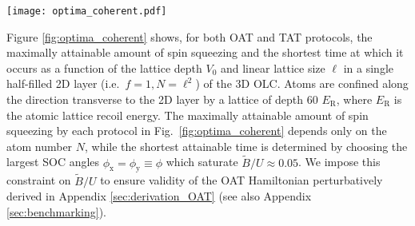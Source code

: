 \documentclass[aps,prx,superscriptaddress,notitlepage,twocolumn,longbibliography]{revtex4-2}
\renewcommand{\t}{\text} %
\newcommand{\x}{\text{x}}
\newcommand{\y}{\text{y}}
\begin{document}
\begin{figure*}
\centering
\texttt{[image: optima\_coherent.pdf]}
\caption{{\bf Optimal squeezing} with one- and two-axis twisting in a 2D section of the 3D $^{87}$Sr optical lattice clock.
({\bf a}) The maximum amount of squeezing depends only on the atom number $N=\ell^2$, where $\ell$ is the number of lattice sites along each axis of the lattice.
While the time scales for squeezing generally depend on several experimental parameters, the time at which maximal squeezing occurs can be minimized at any given lattice depth $V_0$ by choosing SOC angles $\phi$ that saturate $\widetilde{B}/U\approx0.05$, where $\widetilde{B}$ is the variance of the SOC-induced axial field and $U$ is the two-atom on-site interaction energy.
Panels ({\bf b}, {\bf c}) show these minimal squeezing times as a function of the depth $V_0$ and linear size $\ell$ of the lattice.
Lattice depths $V_0$ are normalized to the atomic lattice recoil energy $E_{\t{R}}$, and the upper axis on panels ({\bf b}, {\bf c}) marks values of  $U/J$ at fixed lattice depths.
In general, TAT achieves more squeezing than OAT for any system size, and achieves optimal squeezing faster for $N\gtrsim400$ atoms, as denoted by a dotted line in panels ({\bf b}, {\bf c}).
}
\label{fig:optima_coherent}
\end{figure*}

Figure \ref{fig:optima_coherent} shows, for both OAT and TAT protocols, the maximally attainable amount of spin squeezing and the shortest time at which it occurs as a function of the lattice depth $V_0$ and linear lattice size $\ell$ in a single half-filled 2D layer (i.e.~$f=1,N=\ell^2$) of the 3D OLC.
Atoms are confined along the direction transverse to the 2D layer by a lattice of depth 60 $E_{\t{R}}$, where $E_{\t{R}}$ is the atomic lattice recoil energy.
The maximally attainable amount of spin squeezing by each protocol in Fig.~\ref{fig:optima_coherent} depends only on the atom number $N$, while the shortest attainable time is determined by choosing the largest SOC angles $\phi_\x=\phi_\y\equiv\phi$ which saturate $\widetilde{B}/U\approx0.05$.
We impose this constraint on $\widetilde{B}/U$ to ensure validity of the OAT Hamiltonian perturbatively derived in Appendix \ref{sec:derivation_OAT} (see also Appendix \ref{sec:benchmarking}).
\end{document}
